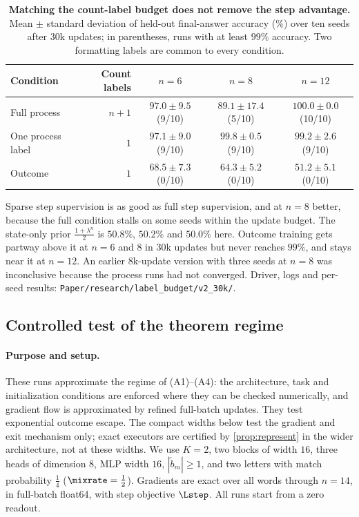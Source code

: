 \begin{table}[H]
\centering\small
\begin{tabular}{@{}lrccc@{}}
\toprule
Condition & Count labels & $n=6$ & $n=8$ & $n=12$\\
\midrule
Full process & $n+1$ & $97.0\pm9.5$ (9/10) & $89.1\pm17.4$ (5/10) & $100.0\pm0.0$ (10/10)\\
One process label & $1$ & $97.1\pm9.0$ (9/10) & $99.8\pm0.5$ (9/10) & $99.2\pm2.6$ (9/10)\\
Outcome & $1$ & $68.5\pm7.3$ (0/10) & $64.3\pm5.2$ (0/10) & $51.2\pm5.1$ (0/10)\\
\bottomrule
\end{tabular}
\caption{\textbf{Matching the count-label budget does not remove the step advantage.} Mean $\pm$ standard deviation of
held-out final-answer accuracy (\%) over ten seeds after $30$k updates; in parentheses, runs with at least $99\%$ accuracy.
Two formatting labels are common to every condition.}
\label{tab:label-budget}
\end{table}
Sparse step supervision is as good as full step supervision, and at $n=8$ better, because the full condition stalls on
some seeds within the update budget. The state-only prior $\frac{1+\lambda^n}2$ is $50.8\%$, $50.2\%$ and $50.0\%$ here. Outcome training
gets partway above it at $n=6$ and $8$ in $30$k updates but never reaches $99\%$, and stays near it at $n=12$. An earlier $8$k-update version with
three seeds at $n=8$ was inconclusive because the process runs had not converged. Driver, logs and per-seed results:
\nolinkurl{Paper/research/label_budget/v2_30k/}.

\subsection{Controlled test of the theorem regime}
\label{app:exp-regime}
\label{app:regime}
\paragraph{Purpose and setup.} These runs approximate the regime of (A1)--(A4): the architecture, task and initialization conditions are enforced where
they can be checked numerically, and gradient flow is approximated by refined full-batch updates. They test exponential outcome
escape. The compact widths below test the gradient and exit mechanism only;
exact executors are certified by \cref{prop:represent} in the wider architecture, not at these widths.
We use $K=2$, two blocks of width $16$, three heads of dimension $8$, MLP width $16$, $|\tilde b_m|\ge1$,
and two letters with match probability $\tfrac{1}{4}$ ($\mixrate=\tfrac{1}{2}$). Gradients are exact over all words through $n=14$,
in full-batch float64, with step objective $\Lstep$. All runs start from a zero readout.

